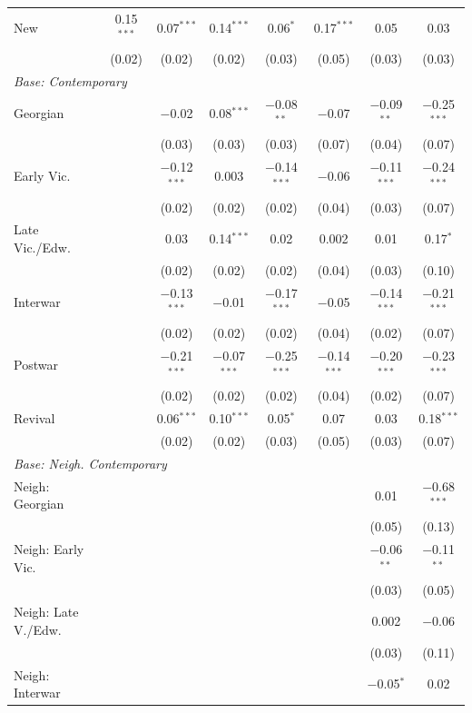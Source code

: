 \documentclass[]{article}
\begin{document}
\begin{table}[!htbp]
\begin{tabular}{@{\extracolsep{5pt}}lccccccc}
  New & 0.15$^{***}$ & 0.07$^{***}$ & 0.14$^{***}$ & 0.06$^{*}$ & 0.17$^{***}$ & 0.05 & 0.03 \\ 
  & (0.02) & (0.02) & (0.02) & (0.03) & (0.05) & (0.03) & (0.03) \\ 
     \midrule
 \multicolumn{3}{l}{\emph{Base: Contemporary}}
\vspace{2mm} \\
  Georgian &  & $-$0.02 & 0.08$^{***}$ & $-$0.08$^{**}$ & $-$0.07 & $-$0.09$^{**}$ & $-$0.25$^{***}$ \\ 
  &  & (0.03) & (0.03) & (0.03) & (0.07) & (0.04) & (0.07) \\ 
  Early Vic. &  & $-$0.12$^{***}$ & 0.003 & $-$0.14$^{***}$ & $-$0.06 & $-$0.11$^{***}$ & $-$0.24$^{***}$ \\ 
  &  & (0.02) & (0.02) & (0.02) & (0.04) & (0.03) & (0.07) \\ 
  Late Vic./Edw. &  & 0.03 & 0.14$^{***}$ & 0.02 & 0.002 & 0.01 & 0.17$^{*}$ \\ 
  &  & (0.02) & (0.02) & (0.02) & (0.04) & (0.03) & (0.10) \\ 
  Interwar &  & $-$0.13$^{***}$ & $-$0.01 & $-$0.17$^{***}$ & $-$0.05 & $-$0.14$^{***}$ & $-$0.21$^{***}$ \\ 
  &  & (0.02) & (0.02) & (0.02) & (0.04) & (0.02) & (0.07) \\ 
  Postwar &  & $-$0.21$^{***}$ & $-$0.07$^{***}$ & $-$0.25$^{***}$ & $-$0.14$^{***}$ & $-$0.20$^{***}$ & $-$0.23$^{***}$ \\ 
  &  & (0.02) & (0.02) & (0.02) & (0.04) & (0.02) & (0.07) \\ 
  Revival &  & 0.06$^{***}$ & 0.10$^{***}$ & 0.05$^{*}$ & 0.07 & 0.03 & 0.18$^{***}$ \\ 
  &  & (0.02) & (0.02) & (0.03) & (0.05) & (0.03) & (0.07) \\ 
       \midrule
 \multicolumn{3}{l}{\emph{Base: Neigh. Contemporary}}
\vspace{2mm} \\
  Neigh: Georgian &  &  &  &  &  & 0.01 & $-$0.68$^{***}$ \\ 
  &  &  &  &  &  & (0.05) & (0.13) \\ 
  Neigh: Early Vic. &  &  &  &  &  & $-$0.06$^{**}$ & $-$0.11$^{**}$ \\ 
  &  &  &  &  &  & (0.03) & (0.05) \\ 
  Neigh: Late V./Edw. &  &  &  &  &  & 0.002 & $-$0.06 \\ 
  &  &  &  &  &  & (0.03) & (0.11) \\ 
  Neigh: Interwar &  &  &  &  &  & $-$0.05$^{*}$ & 0.02 \\ 

\end{tabular}
\end{table}
\end{document}
